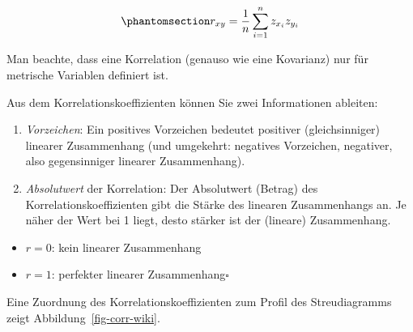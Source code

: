 \documentclass[
  letterpaper,
]{scrbook}
\providecommand{\tightlist}{%
  \setlength{\itemsep}{0pt}\setlength{\parskip}{0pt}}\usepackage{longtable,booktabs,array}
\theoremstyle{definition}
\theoremstyle{definition}
\theoremstyle{definition}
\theoremstyle{remark}
\begin{document}
\begin{equation}\phantomsection\label{eq-r-def}{r_{xy}=\frac{1}{n}\sum_{i=1}^n z_{x_i} z_{y_i}}\end{equation}

Man beachte, dass eine Korrelation (genauso wie eine Kovarianz) nur für
metrische Variablen definiert ist.

\begin{tcolorbox}[enhanced jigsaw, colbacktitle=quarto-callout-note-color!10!white, coltitle=black, bottomrule=.15mm, rightrule=.15mm, arc=.35mm, toptitle=1mm, colframe=quarto-callout-note-color-frame, opacitybacktitle=0.6, left=2mm, leftrule=.75mm, breakable, opacityback=0, bottomtitle=1mm, titlerule=0mm, title=\textcolor{quarto-callout-note-color}{\faInfo}\hspace{0.5em}{Hinweis}, colback=white, toprule=.15mm]

Aus dem Korrelationskoeffizienten können Sie zwei Informationen
ableiten:

\begin{enumerate}
\def\labelenumi{\arabic{enumi}.}
\tightlist
\item
  \emph{Vorzeichen}: Ein positives Vorzeichen bedeutet positiver
  (gleichsinniger) linearer Zusammenhang (und umgekehrt: negatives
  Vorzeichen, negativer, also gegensinniger linearer Zusammenhang).
\item
  \emph{Absolutwert} der Korrelation: Der Absolutwert (Betrag) des
  Korrelationskoeffizienten gibt die Stärke des linearen Zusammenhangs
  an. Je näher der Wert bei 1 liegt, desto stärker ist der (lineare)
  Zusammenhang.
\end{enumerate}

\begin{itemize}
\tightlist
\item
  \(r = 0\): kein linearer Zusammenhang
\item
  \(r = 1\): perfekter linearer Zusammenhang\(\square\)
\end{itemize}

\end{tcolorbox}

Eine Zuordnung des Korrelationskoeffizienten zum Profil des
Streudiagramms zeigt Abbildung~\ref{fig-corr-wiki}.
\end{document}
